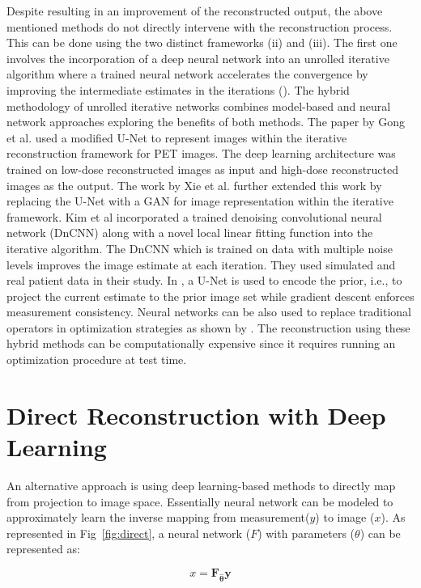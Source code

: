 Despite resulting in an improvement of the reconstructed output, the above mentioned methods do not directly intervene with the reconstruction process. This can be done using the two distinct frameworks (ii) and (iii). The first one involves the incorporation of a deep neural network into an unrolled iterative algorithm where a trained neural network accelerates the convergence by improving the intermediate estimates in the iterations (\cite{gong2019iterative,xie2019generative,kim2018penalized}). The hybrid methodology of unrolled iterative networks combines model-based and neural network approaches exploring the benefits of both methods. 
The paper by Gong et al. used a modified U-Net to represent images within the iterative reconstruction framework for \ac{PET} images. The deep learning architecture was trained on low-dose reconstructed images as input and high-dose reconstructed images as the output. The work by Xie et al. further extended this work by replacing the U-Net with a \ac{GAN} for image representation within the iterative framework. Kim et al incorporated a trained denoising convolutional neural network (DnCNN) along with a novel local linear fitting function into the iterative algorithm. The DnCNN which is trained on data with multiple noise levels improves the image estimate at each iteration. They used simulated and real patient data in their study. In \cite{gupta2018cnn}, a U-Net is used to encode the prior, i.e., to project the current estimate to the prior image set while gradient descent enforces measurement consistency. Neural networks can be also used to replace traditional operators in optimization strategies as shown by \cite{adler2018learned}. The reconstruction using these hybrid methods can be computationally expensive since it requires running an optimization procedure at test time.

\section{Direct Reconstruction with Deep Learning}

An alternative approach is using deep learning-based methods to directly map from projection to image space. Essentially neural network can be modeled to approximately learn  the inverse mapping from measurement($y$) to image ($x$). As represented in Fig~\ref{fig:direct}, a neural network ($F$) with parameters ($\theta$) can be represented as:

\begin{equation}\label{eq:direct}
x=\boldsymbol{F}_{\widehat{\boldsymbol{\theta}}} \boldsymbol{y}
\end{equation}

